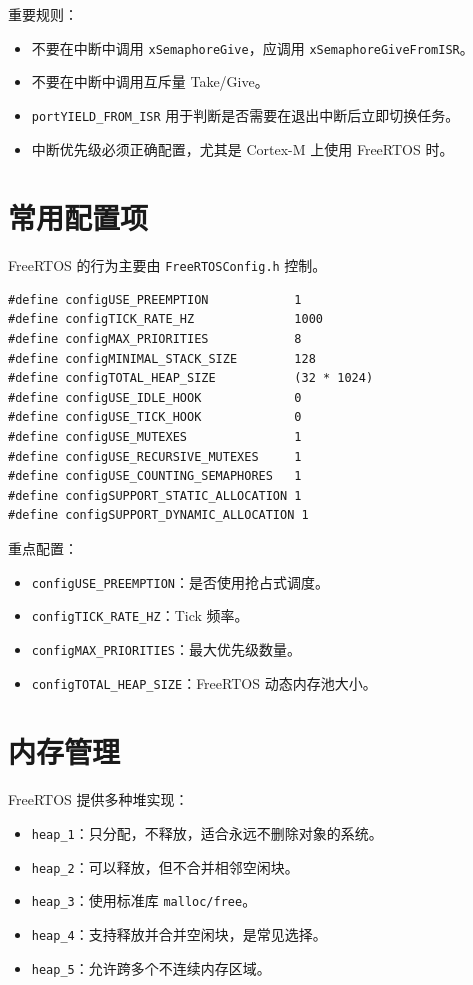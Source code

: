 \documentclass[12pt,a4paper]{ctexart}
\begin{document}
重要规则：

\begin{itemize}
    \item 不要在中断中调用 \texttt{xSemaphoreGive}，应调用 \texttt{xSemaphoreGiveFromISR}。
    \item 不要在中断中调用互斥量 Take/Give。
    \item \texttt{portYIELD\_FROM\_ISR} 用于判断是否需要在退出中断后立即切换任务。
    \item 中断优先级必须正确配置，尤其是 Cortex-M 上使用 FreeRTOS 时。
\end{itemize}

\section{常用配置项}

FreeRTOS 的行为主要由 \texttt{FreeRTOSConfig.h} 控制。

\begin{lstlisting}
#define configUSE_PREEMPTION            1
#define configTICK_RATE_HZ              1000
#define configMAX_PRIORITIES            8
#define configMINIMAL_STACK_SIZE        128
#define configTOTAL_HEAP_SIZE           (32 * 1024)
#define configUSE_IDLE_HOOK             0
#define configUSE_TICK_HOOK             0
#define configUSE_MUTEXES               1
#define configUSE_RECURSIVE_MUTEXES     1
#define configUSE_COUNTING_SEMAPHORES   1
#define configSUPPORT_STATIC_ALLOCATION 1
#define configSUPPORT_DYNAMIC_ALLOCATION 1
\end{lstlisting}

重点配置：

\begin{itemize}
    \item \texttt{configUSE\_PREEMPTION}：是否使用抢占式调度。
    \item \texttt{configTICK\_RATE\_HZ}：Tick 频率。
    \item \texttt{configMAX\_PRIORITIES}：最大优先级数量。
    \item \texttt{configTOTAL\_HEAP\_SIZE}：FreeRTOS 动态内存池大小。
\end{itemize}

\section{内存管理}

FreeRTOS 提供多种堆实现：

\begin{itemize}
    \item \texttt{heap\_1}：只分配，不释放，适合永远不删除对象的系统。
    \item \texttt{heap\_2}：可以释放，但不合并相邻空闲块。
    \item \texttt{heap\_3}：使用标准库 \texttt{malloc/free}。
    \item \texttt{heap\_4}：支持释放并合并空闲块，是常见选择。
    \item \texttt{heap\_5}：允许跨多个不连续内存区域。
\end{itemize}
\end{document}
